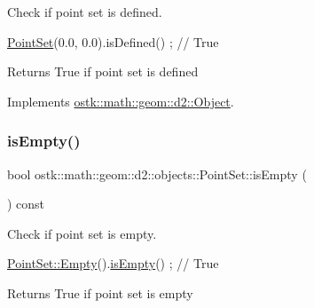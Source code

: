 Check if point set is defined. 


\begin{DoxyCode}
\hyperlink{classostk_1_1math_1_1geom_1_1d2_1_1objects_1_1_point_set_a736eff7b0d1c876b304bfa7d1d2d0095}{PointSet}(0.0, 0.0).isDefined() ; \textcolor{comment}{// True}
\end{DoxyCode}


\begin{DoxyReturn}{Returns}
True if point set is defined 
\end{DoxyReturn}


Implements \hyperlink{classostk_1_1math_1_1geom_1_1d2_1_1_object_a456cc7121218d24c1322d0fe54230cc4}{ostk\+::math\+::geom\+::d2\+::\+Object}.

\mbox{\label{classostk_1_1math_1_1geom_1_1d2_1_1objects_1_1_point_set_a1df6b975efcbfc495dbdc947dc632846}} 
\subsubsection{\texorpdfstring{is\+Empty()}{isEmpty()}}
{\footnotesize\ttfamily bool ostk\+::math\+::geom\+::d2\+::objects\+::\+Point\+Set\+::is\+Empty (\begin{DoxyParamCaption}{ }\end{DoxyParamCaption}) const}



Check if point set is empty. 


\begin{DoxyCode}
\hyperlink{classostk_1_1math_1_1geom_1_1d2_1_1objects_1_1_point_set_a09f5e125c7b4545a75e4eea6193bf615}{PointSet::Empty}().\hyperlink{classostk_1_1math_1_1geom_1_1d2_1_1objects_1_1_point_set_a1df6b975efcbfc495dbdc947dc632846}{isEmpty}() ; \textcolor{comment}{// True}
\end{DoxyCode}


\begin{DoxyReturn}{Returns}
True if point set is empty 
\end{DoxyReturn}
\mbox{\label{classostk_1_1math_1_1geom_1_1d2_1_1objects_1_1_point_set_ab11988a5a567985298249b3e8d30842b}} 
